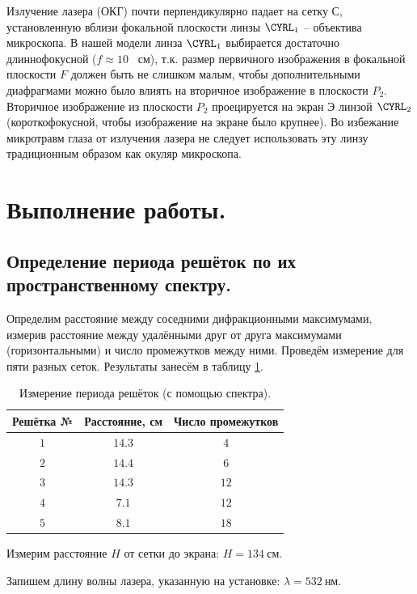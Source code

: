 \documentclass[a4paper, 12pt, twoside]{article}
\begin{document}
	Излучение лазера (ОКГ) почти перпендикулярно падает на сетку С, установленную вблизи фокальной плоскости линзы $\text{\CYRL}_1$ -- объектива микроскопа. В нашей модели линза $\text{\CYRL}_1$ выбирается достаточно длиннофокусной ($f\approx 10$~ см), т.к. размер первичного изображения в фокальной плоскости $F$ должен быть не слишком малым, чтобы дополнительными диафрагмами можно было влиять на вторичное изображение в плоскости $P_2$. Вторичное изображение из плоскости $P_2$ проецируется на экран Э линзой $\text{\CYRL}_2$ (короткофокусной, чтобы изображение на экране было крупнее). Во избежание микротравм глаза от излучения лазера не следует использовать эту линзу традиционным образом как окуляр микроскопа.
	
	\newpage
	\section{Выполнение работы.}
	\subsection{Определение периода решёток по их пространственному спектру.}
	
	Определим расстояние между соседними дифракционными максимумами, измерив расстояние между удалёнными друг от друга максимумами (горизонтальными) и число промежутков между ними. Проведём измерение для пяти разных сеток. Результаты занесём в таблицу \ref{t1}.
	
	\begin{table}[H]
		\centering
		\caption{Измерение периода решёток (с помощью спектра).}
		\label{t1}
		\begin{tabular}{c|c|c} \toprule
			Решётка № & Расстояние, см & Число промежутков \\ \midrule
			$1$       & $14.3$         & $4$               \\
			$2$       & $14.4$         & $6$               \\
			$3$       & $14.3$         & $12$              \\
			$4$       & $7.1$          & $12$              \\
			$5$       & $8.1$          & $18$              \\ \bottomrule
		\end{tabular}
	\end{table}

	Измерим расстояние $H$ от сетки до экрана: $H = 134~\text{см}$.
	
	Запишем длину волны лазера, указанную на установке: $\lambda = 532~\text{нм}$.
	
\end{document}
